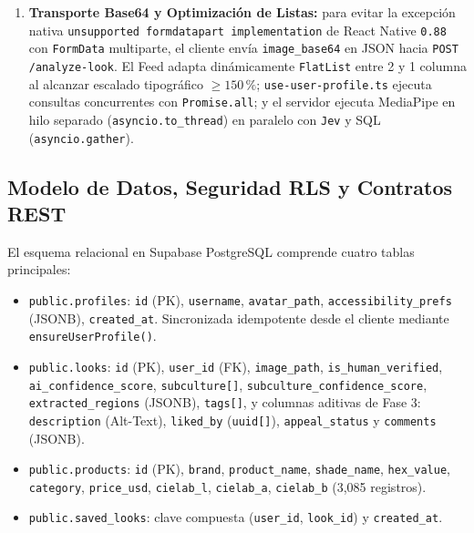 \documentclass[conference]{IEEEtran}
\begin{document}
\begin{enumerate}
    \item \textbf{Transporte Base64 y Optimización de Listas:} para evitar la excepción nativa \texttt{unsupported formdatapart implementation} de React Native \texttt{0.88} con \texttt{FormData} multiparte, el cliente envía \texttt{image\_base64} en JSON hacia \texttt{POST /analyze-look}. El Feed adapta dinámicamente \texttt{FlatList} entre 2 y 1 columna al alcanzar escalado tipográfico $\ge 150\,\%$; \texttt{use-user-profile.ts} ejecuta consultas concurrentes con \texttt{Promise.all}; y el servidor ejecuta MediaPipe en hilo separado (\texttt{asyncio.to\_thread}) en paralelo con \texttt{Jev} y SQL (\texttt{asyncio.gather}).
\end{enumerate}

\subsection{Modelo de Datos, Seguridad RLS y Contratos REST}
El esquema relacional en Supabase PostgreSQL comprende cuatro tablas principales:
\begin{itemize}
    \item \texttt{public.profiles}: \texttt{id} (PK), \texttt{username}, \texttt{avatar\_path}, \texttt{accessibility\_prefs} (JSONB), \texttt{created\_at}. Sincronizada idempotente desde el cliente mediante \texttt{ensureUserProfile()}.
    \item \texttt{public.looks}: \texttt{id} (PK), \texttt{user\_id} (FK), \texttt{image\_path}, \texttt{is\_human\_verified}, \texttt{ai\_confidence\_score}, \texttt{subculture[]}, \texttt{subculture\_confidence\_score}, \texttt{extracted\_regions} (JSONB), \texttt{tags[]}, y columnas aditivas de Fase 3: \texttt{description} (Alt-Text), \texttt{liked\_by} (\texttt{uuid[]}), \texttt{appeal\_status} y \texttt{comments} (JSONB).
    \item \texttt{public.products}: \texttt{id} (PK), \texttt{brand}, \texttt{product\_name}, \texttt{shade\_name}, \texttt{hex\_value}, \texttt{category}, \texttt{price\_usd}, \texttt{cielab\_l}, \texttt{cielab\_a}, \texttt{cielab\_b} (3,085 registros).
    \item \texttt{public.saved\_looks}: clave compuesta (\texttt{user\_id}, \texttt{look\_id}) y \texttt{created\_at}.
\end{itemize}
\end{document}
